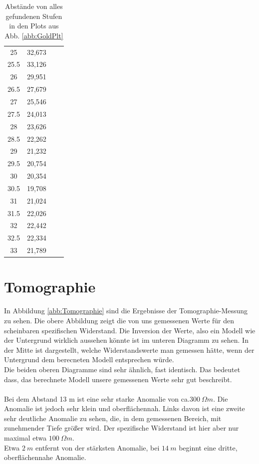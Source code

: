 \begin{table}[h]
\begin{center}
\begin{tabular}[central]{ c  c  | c  c}
25	&	32,673	\\
25.5	&	33,126	\\
26	&	29,951	\\
26.5	&	27,679	\\
27	&	25,546	\\
27.5	&	24,013	\\
28	&	23,626	\\
28.5	&	22,262	\\
29	&	21,232	\\
29.5	&	20,754	\\
30	&	20,354	\\
30.5	&	19,708	\\
31	&	21,024	\\
31.5	&	22,026	\\
32	&	22,442	\\
32.5	&	22,334	\\
33	&	21,789	\\


\end{tabular}
\caption{Abstände von alles gefundenen Stufen in den Plots aus Abb. \ref{abb:GoldPlt}}
\label{tab:wenner}
\end{center}
\end{table}


\section{Tomographie}

In Abbildung \ref{abb:Tomographie} sind die Ergebnisse der Tomographie-Messung zu sehen. Die obere Abbildung zeigt die von uns gemessenen Werte für den scheinbaren spezifischen Widerstand. Die Inversion der Werte, also ein Modell wie der Untergrund 
wirklich aussehen könnte ist im unteren Diagramm zu sehen. In der Mitte ist dargestellt, welche Widerstandswerte man gemessen hätte, wenn der Untergrund dem berecneten Modell entsprechen würde.\\
Die beiden oberen Diagramme sind sehr ähnlich, fast identisch. Das bedeutet dass, das berechnete Modell unsere gemessenen Werte sehr gut beschreibt. \\
\\
Bei dem Abstand 13 m ist eine sehr starke Anomalie von ca.$ \SI{ 300}{\Omega m}$. Die Anomalie ist jedoch sehr klein und oberflächennah. Links davon ist eine zweite sehr deutliche Anomalie zu sehen, die, in dem gemessenen Bereich,
mit zunehmender Tiefe größer wird. Der spezifische Widerstand ist hier aber nur maximal etwa $\SI{100}{\Omega m}$. \\
Etwa $\SI{2}{m}$ entfernt von der stärksten Anomalie, bei  $\SI{14}{m}$ beginnt eine dritte, oberflächennahe Anomalie. \\

